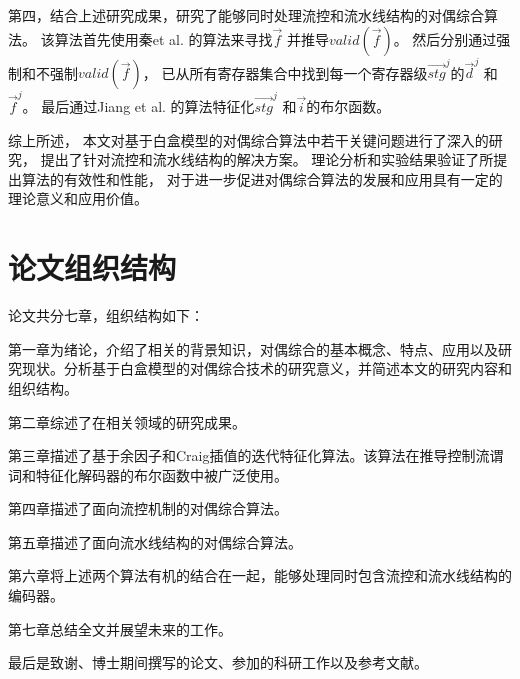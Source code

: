第四，结合上述研究成果，研究了能够同时处理流控和流水线结构的对偶综合算法。
该算法首先使用秦et al. \cite{QinTODAES15}的算法来寻找$\vec{f}$ 并推导$valid(\vec{f})$。
然后分别通过强制和不强制$valid(\vec{f})$，
已从所有寄存器集合中找到每一个寄存器级$\vec{stg}^j$的$\vec{d}^j$ 和$\vec{f}^j$。
最后通过Jiang et al. \cite{InterpBoolFunction}的算法特征化$\vec{stg}^j$ 和$\vec{i}$的布尔函数。

综上所述，
本文对基于白盒模型的对偶综合算法中若干关键问题进行了深入的研究，
提出了针对流控和流水线结构的解决方案。
理论分析和实验结果验证了所提出算法的有效性和性能，
对于进一步促进对偶综合算法的发展和应用具有一定的理论意义和应用价值。

\section{论文组织结构}
论文共分七章，组织结构如下：

第一章为绪论，介绍了相关的背景知识，对偶综合的基本概念、特点、应用以及研究现状。分析基于白盒模型的对偶综合技术的研究意义，并简述本文的研究内容和组织结构。

第二章综述了在相关领域的研究成果。

第三章描述了基于余因子和Craig插值的迭代特征化算法。该算法在推导控制流谓词和特征化解码器的布尔函数中被广泛使用。

第四章描述了面向流控机制的对偶综合算法。

第五章描述了面向流水线结构的对偶综合算法。

第六章将上述两个算法有机的结合在一起，能够处理同时包含流控和流水线结构的编码器。

第七章总结全文并展望未来的工作。

最后是致谢、博士期间撰写的论文、参加的科研工作以及参考文献。
